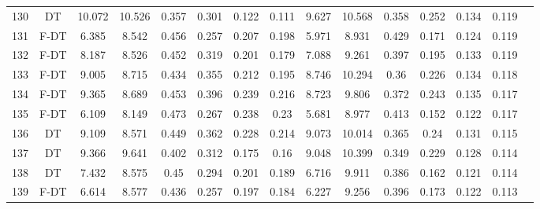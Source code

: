 \begin{longtable}{@{\hskip3pt}c@{\hskip3pt}c@{\hskip3pt}c@{\hskip3pt}c@{\hskip3pt}c@{\hskip3pt}c@{\hskip3pt}c@{\hskip3pt}c@{\hskip3pt}c@{\hskip3pt}c@{\hskip3pt}c@{\hskip3pt}c@{\hskip3pt}c@{\hskip3pt}c@{\hskip3pt}c}
        130 &             DT &            10.072 &      10.526 &           0.357 &           0.301 &           0.122 &           0.111 &               9.627 &      10.568 &           0.358 &         0.252 &          0.134 &           0.119 \\
        131 &           F-DT &             6.385 &       8.542 &           0.456 &           0.257 &           0.207 &           0.198 &               5.971 &       8.931 &           0.429 &         0.171 &          0.124 &           0.119 \\
        132 &           F-DT &             8.187 &       8.526 &           0.452 &           0.319 &           0.201 &           0.179 &               7.088 &       9.261 &           0.397 &         0.195 &          0.133 &           0.119 \\
        133 &           F-DT &             9.005 &       8.715 &           0.434 &           0.355 &           0.212 &           0.195 &               8.746 &      10.294 &            0.36 &         0.226 &          0.134 &           0.118 \\
        134 &           F-DT &             9.365 &       8.689 &           0.453 &           0.396 &           0.239 &           0.216 &               8.723 &       9.806 &           0.372 &         0.243 &          0.135 &           0.117 \\
        135 &           F-DT &             6.109 &       8.149 &           0.473 &           0.267 &           0.238 &            0.23 &               5.681 &       8.977 &           0.413 &         0.152 &          0.122 &           0.117 \\
        136 &             DT &             9.109 &       8.571 &           0.449 &           0.362 &           0.228 &           0.214 &               9.073 &      10.014 &           0.365 &          0.24 &          0.131 &           0.115 \\
        137 &             DT &             9.366 &       9.641 &           0.402 &           0.312 &           0.175 &            0.16 &               9.048 &      10.399 &           0.349 &         0.229 &          0.128 &           0.114 \\
        138 &             DT &             7.432 &       8.575 &            0.45 &           0.294 &           0.201 &           0.189 &               6.716 &       9.911 &           0.386 &         0.162 &          0.121 &           0.114 \\
        139 &           F-DT &             6.614 &       8.577 &           0.436 &           0.257 &           0.197 &           0.184 &               6.227 &       9.256 &           0.396 &         0.173 &          0.122 &           0.113 \\

\end{longtable}
